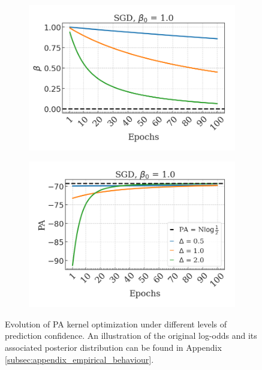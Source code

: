 \begin{figure}[H]
    \centering
    \begin{subfigure}[b]{0.45\textwidth}
        \centering
        \includegraphics[width=\textwidth]{img/results_discussion/empirical/nonrob_met=betas_hue=ldiff.png}
    \end{subfigure}
    \hfill
    \begin{subfigure}[b]{0.45\textwidth}
        \centering
        \includegraphics[width=\textwidth]{img/results_discussion/empirical/nonrob_met=logPA_hue=ldiff.png}
    \end{subfigure}
    \caption{Evolution of PA kernel optimization under different levels of prediction 
    confidence. An illustration of the original log-odds and its associated posterior distribution
    can be found in Appendix \ref{subsec:appendix_empirical_behaviour}.}
    \label{fig:prediction_confidence}
\end{figure}


